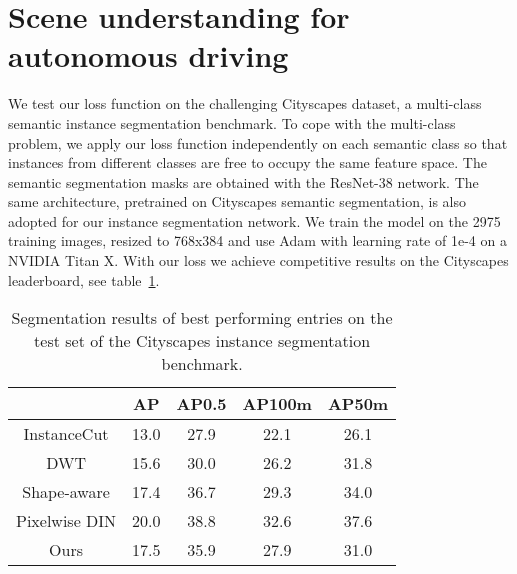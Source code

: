 \documentclass{article}
\begin{document}
\section{Scene understanding for autonomous driving}
We test our loss function on the challenging Cityscapes dataset, a multi-class semantic instance segmentation benchmark. To cope with the multi-class problem, we apply our loss function independently on each semantic class so that instances from different classes are free to occupy the same feature space. The semantic segmentation masks are obtained
with the ResNet-38 network. The same architecture, pretrained on Cityscapes semantic segmentation, is also adopted for our instance segmentation network. We train the model on the 2975 training images, resized to 768x384 and use Adam with learning rate of 1e-4 on a NVIDIA Titan X. With our loss we achieve competitive results on the Cityscapes leaderboard, see table~\ref{Tab:experiment}.\par
\begin{table}
\centering
\caption{Segmentation results of best performing entries on the test set of the Cityscapes instance segmentation benchmark.}
\begin{tabular}{ccccc}
 \toprule
               & AP   & AP0.5 & AP100m & AP50m \\
 \midrule
 InstanceCut   & 13.0 & 27.9  & 22.1   & 26.1  \\
         DWT   & 15.6 & 30.0  & 26.2   & 31.8  \\
 Shape-aware   & 17.4 & 36.7  & 29.3   & 34.0  \\
 Pixelwise DIN & 20.0 & 38.8  & 32.6   & 37.6  \\
          Ours & 17.5 & 35.9  & 27.9   & 31.0  \\ 
\bottomrule
\end{tabular}
\label{Tab:experiment}
\end{table}
\newpage
 

\end{document}
